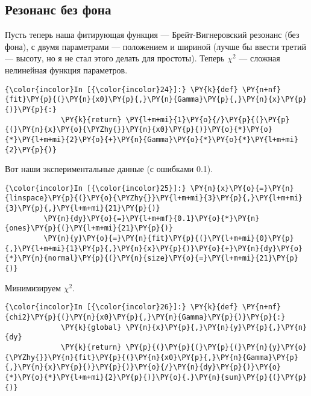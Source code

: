 \subsection{Резонанс без
фона}\label{ux440ux435ux437ux43eux43dux430ux43dux441-ux431ux435ux437-ux444ux43eux43dux430}

Пусть теперь наша фитирующая функция --- Брейт-Вигнеровский резонанс (без
фона), с двумя параметрами --- положением и шириной (лучше бы ввести
третий --- высоту, но я не стал этого делать для простоты). Теперь
\(\chi^2\) --- сложная нелинейная функция параметров.

    \begin{Verbatim}[commandchars=\\\{\}]
{\color{incolor}In [{\color{incolor}24}]:} \PY{k}{def} \PY{n+nf}{fit}\PY{p}{(}\PY{n}{x0}\PY{p}{,}\PY{n}{Gamma}\PY{p}{,}\PY{n}{x}\PY{p}{)}\PY{p}{:}
             \PY{k}{return} \PY{l+m+mi}{1}\PY{o}{/}\PY{p}{(}\PY{p}{(}\PY{n}{x}\PY{o}{\PYZhy{}}\PY{n}{x0}\PY{p}{)}\PY{o}{*}\PY{o}{*}\PY{l+m+mi}{2}\PY{o}{+}\PY{n}{Gamma}\PY{o}{*}\PY{o}{*}\PY{l+m+mi}{2}\PY{p}{)}
\end{Verbatim}


    Вот наши экспериментальные данные (с ошибками 0.1).

    \begin{Verbatim}[commandchars=\\\{\}]
{\color{incolor}In [{\color{incolor}25}]:} \PY{n}{x}\PY{o}{=}\PY{n}{linspace}\PY{p}{(}\PY{o}{\PYZhy{}}\PY{l+m+mi}{3}\PY{p}{,}\PY{l+m+mi}{3}\PY{p}{,}\PY{l+m+mi}{21}\PY{p}{)}
         \PY{n}{dy}\PY{o}{=}\PY{l+m+mf}{0.1}\PY{o}{*}\PY{n}{ones}\PY{p}{(}\PY{l+m+mi}{21}\PY{p}{)}
         \PY{n}{y}\PY{o}{=}\PY{n}{fit}\PY{p}{(}\PY{l+m+mi}{0}\PY{p}{,}\PY{l+m+mi}{1}\PY{p}{,}\PY{n}{x}\PY{p}{)}\PY{o}{+}\PY{n}{dy}\PY{o}{*}\PY{n}{normal}\PY{p}{(}\PY{n}{size}\PY{o}{=}\PY{l+m+mi}{21}\PY{p}{)}
\end{Verbatim}


    Минимизируем \(\chi^2\).

    \begin{Verbatim}[commandchars=\\\{\}]
{\color{incolor}In [{\color{incolor}26}]:} \PY{k}{def} \PY{n+nf}{chi2}\PY{p}{(}\PY{n}{x0}\PY{p}{,}\PY{n}{Gamma}\PY{p}{)}\PY{p}{:}
             \PY{k}{global} \PY{n}{x}\PY{p}{,}\PY{n}{y}\PY{p}{,}\PY{n}{dy}
             \PY{k}{return} \PY{p}{(}\PY{p}{(}\PY{p}{(}\PY{n}{y}\PY{o}{\PYZhy{}}\PY{n}{fit}\PY{p}{(}\PY{n}{x0}\PY{p}{,}\PY{n}{Gamma}\PY{p}{,}\PY{n}{x}\PY{p}{)}\PY{p}{)}\PY{o}{/}\PY{n}{dy}\PY{p}{)}\PY{o}{*}\PY{o}{*}\PY{l+m+mi}{2}\PY{p}{)}\PY{o}{.}\PY{n}{sum}\PY{p}{(}\PY{p}{)}
\end{Verbatim}


